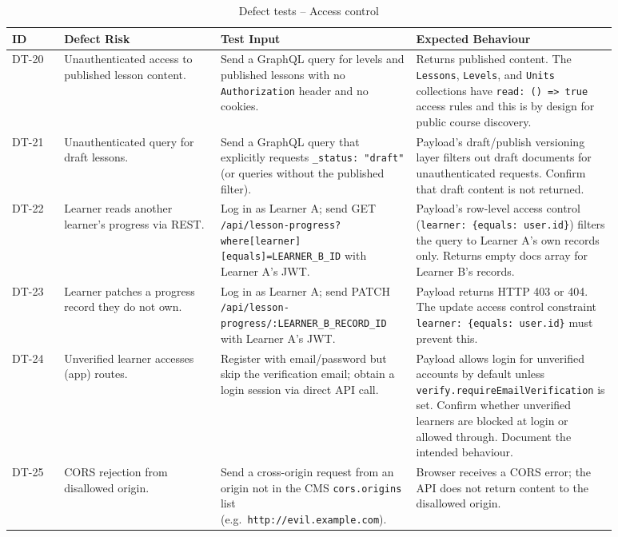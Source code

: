 \begin{longtable}{p{0.08\linewidth} p{0.24\linewidth} p{0.30\linewidth} p{0.26\linewidth}}
\caption{Defect tests -- Access control}\\
\toprule
ID & Defect Risk & Test Input & Expected Behaviour \\
\midrule
\endhead
DT-20 & Unauthenticated access to published lesson content. & Send a GraphQL query for levels and published lessons with no \texttt{Authorization} header and no cookies. & Returns published content. The \texttt{Lessons}, \texttt{Levels}, and \texttt{Units} collections have \texttt{read: () => true} access rules and this is by design for public course discovery. \\
DT-21 & Unauthenticated query for draft lessons. & Send a GraphQL query that explicitly requests \texttt{\_status: "draft"} (or queries without the published filter). & Payload's draft/publish versioning layer filters out draft documents for unauthenticated requests. Confirm that draft content is not returned. \\
DT-22 & Learner reads another learner's progress via REST. & Log in as Learner A; send GET \texttt{/api/lesson-progress?where[learner][equals]=LEARNER\_B\_ID} with Learner A's JWT. & Payload's row-level access control (\texttt{learner: \{equals: user.id\}}) filters the query to Learner A's own records only. Returns empty docs array for Learner B's records. \\
DT-23 & Learner patches a progress record they do not own. & Log in as Learner A; send PATCH \texttt{/api/lesson-progress/:LEARNER\_B\_RECORD\_ID} with Learner A's JWT. & Payload returns HTTP 403 or 404. The update access control constraint \texttt{learner: \{equals: user.id\}} must prevent this. \\
DT-24 & Unverified learner accesses (app) routes. & Register with email/password but skip the verification email; obtain a login session via direct API call. & Payload allows login for unverified accounts by default unless \texttt{verify.requireEmailVerification} is set. Confirm whether unverified learners are blocked at login or allowed through. Document the intended behaviour. \\
DT-25 & CORS rejection from disallowed origin. & Send a cross-origin request from an origin not in the CMS \texttt{cors.origins} list (e.g.\ \texttt{http://evil.example.com}). & Browser receives a CORS error; the API does not return content to the disallowed origin. \\
\bottomrule
\end{longtable}

